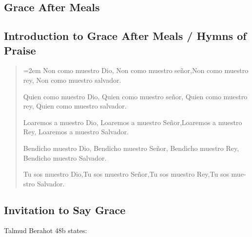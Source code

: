 ﻿\documentclass[a5paper, 12pt]{Birchon}
\begin{document}
\begin{english}
\section*{Grace After Meals}
\subsection*{Introduction to Grace After Meals / Hymns of Praise}
\begin{verse}
{\hangindent=2em
Non como muestro Dio, \newline Non como muestro señor,\newline Non como muestro rey, \newline Non como muestro salvador.

Quien como muestro Dio, \newline Quien como muestro señor, \newline Quien como muestro rey, \newline Quien como muestro salvador.

Loaremos a muestro Dio, \newline Loaremos a muestro Señor,\newline Loaremos a muestro Rey, \newline Loaremos a muestro Salvador.

Bendicho muestro Dio, \newline Bendicho muestro Señor, \newline Bendicho muestro Rey, \newline Bendicho muestro Salvador.

Tu sos muestro Dio,\newline Tu sos muestro Señor,\newline Tu sos muestro Rey,\newline Tu sos muestro Salvador.
}
\end{verse}
\end{english}

\eject

\begin{english}
\subsection*{Invitation to Say Grace}
\end{english}

\regPage{
}
{}
{
Talmud Berahot 48b states:
\begin{quote}
\end{quote}

}
\end{document}
